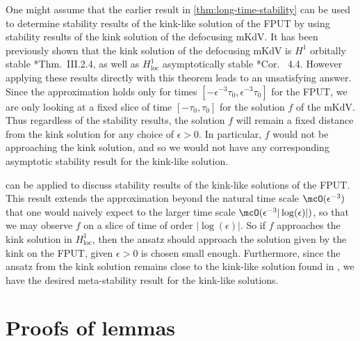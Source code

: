\documentclass[oneside,reqno]{amsart}
\begin{document}
One might assume that the earlier result in \cref{thm:long-time-stability} can be used to determine stability results of the kink-like solution of the FPUT by using stability results of the kink solution of the defocusing mKdV. It has been previously shown that the kink solution of the defocusing mKdV is \(H^1\) orbitally stable \cite{zhidkov2001korteweg}*{Thm.~III.2.4}, as well as \(H^1_{\mathrm{loc}}\) asymptotically stable \cite{merle20032}*{Cor. ~4.4}. However applying these results directly with this theorem leads to an unsatisfying answer. Since the approximation holds only for times \([-\epsilon^{-3} \tau_0, \epsilon^{-3} \tau_0]\) for the FPUT, we are only looking at a fixed slice of time \([-\tau_0, \tau_0 ]\) for the solution \(f\) of the mKdV. Thus regardless of the stability results, the solution \(f\) will remain a fixed distance from the kink solution for any choice of \(\epsilon > 0\). In particular, \(f\) would not be approaching the kink solution, and so we would not have any corresponding asymptotic stability result for the kink-like solution.

 can be applied to discuss stability results of the kink-like solutions of the FPUT. This result extends the approximation beyond the natural time scale \(\mcO(\epsilon^{-3})\) that one would naively expect to the larger time scale \(\mcO(\epsilon^{-3} |\log(\epsilon)|)\), so that we may observe \(f\) on a slice of time of order \(|\log(\epsilon)|\). So if \(f\) approaches the kink solution in \(H^1_{\mathrm{loc}}\), then the ansatz should approach the solution given by the kink on the FPUT, given \(\epsilon>0\) is chosen small enough. Furthermore, since the ansatz from the kink solution remains close to the kink-like solution found in \cite{norton2023kinklike}, we have the desired meta-stability result for the kink-like solutions.

\appendix


\section{Proofs of lemmas}\label{lemma-appendix}
\end{document}
